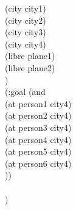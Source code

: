 \documentclass[a4paper,10pt]{article}
\begin{document}
	(city city1)\\
	(city city2)\\
	(city city3)\\
	(city city4)\\
        (libre plane1)\\
        (libre plane2)\\
)\\
(:goal (and\\
	(at person1 city4)\\
	(at person2 city4)\\
	(at person3 city4)\\
	(at person4 city4)\\
	(at person5 city4)\\
	(at person6 city4)\\
	))\\
\\
)\\
\end{document}
